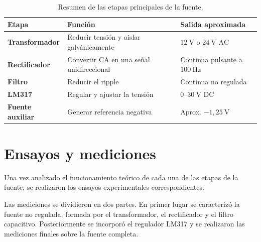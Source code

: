 \documentclass[12pt,a4paper]{article}
\begin{document}
	\begin{table}[H]
		\centering
		
		\caption{Resumen de las etapas principales de la fuente.}
		\label{tab:resumen_etapas}
		
		\begin{tabularx}{\textwidth}{
				>{\bfseries}l
				X
				X
			}
			
			\toprule
			
			Etapa
			&
			Función
			&
			Salida aproximada
			\\
			
			\midrule
			
			Transformador
			&
			Reducir tensión y aislar galvánicamente
			&
			$12~\text{V}$ o $24~\text{V AC}$
			\\
			
			Rectificador
			&
			Convertir CA en una señal unidireccional
			&
			Continua pulsante a $100~\text{Hz}$
			\\
			
			Filtro
			&
			Reducir el ripple
			&
			Continua no regulada
			\\
			
			LM317
			&
			Regular y ajustar la tensión
			&
			$0$--$30~\text{V DC}$
			\\
			
			Fuente auxiliar
			&
			Generar referencia negativa
			&
			Aprox. $-1,25~\text{V}$
			\\
			
			\bottomrule
			
		\end{tabularx}
		
	\end{table}
	
	\newpage
	\section{Ensayos y mediciones}
	
	Una vez analizado el funcionamiento teórico de cada una de las etapas de la
	fuente, se realizaron los ensayos experimentales correspondientes.
	
	Las mediciones se dividieron en dos partes. En primer lugar se caracterizó la
	fuente no regulada, formada por el transformador, el rectificador y el filtro
	capacitivo. Posteriormente se incorporó el regulador LM317 y se realizaron las
	mediciones finales sobre la fuente completa.
	
\end{document}

